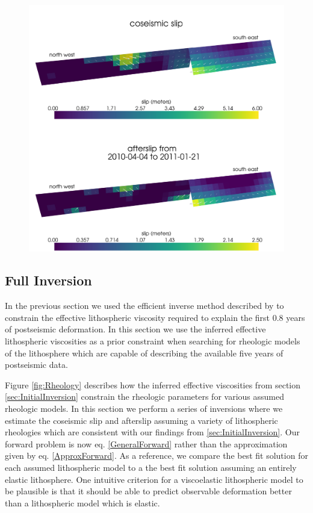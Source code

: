 \documentclass[1p]{elsarticle}
\begin{document}
\begin{figure}
\includegraphics[scale=0.09]{Figures/initialslip}
\caption{}
\label{fig:InitialSlip}
\end{figure} 
 
\subsection{Full Inversion}\label{sec:FullInversion} 

In the previous section we used the efficient inverse method described by \cite{Hines2015} to constrain the effective lithospheric viscosity required to explain the first 0.8 years of postseismic deformation. In this section we use the inferred effective lithospheric viscosities as a prior constraint when searching for rheologic models of the lithosphere which are capable of describing the available five years of postseismic data.   

Figure \ref{fig:Rheology} describes how the inferred effective viscosities from section \ref{sec:InitialInversion} constrain the rheologic parameters for various assumed rheologic models. In this section we perform a series of inversions where we estimate the coseismic slip and afterslip assuming a variety of lithospheric rheologies which are consistent with our findings from \ref{sec:InitialInversion}.  Our forward problem is now eq. \ref{GeneralForward} rather than the approximation given by eq. \ref{ApproxForward}.  As a reference, we compare the best fit solution for each assumed lithospheric model to a the best fit solution assuming an entirely elastic lithosphere. One intuitive criterion for a viscoelastic lithospheric model to be plausible is that it should be able to predict observable deformation better than a lithospheric model which is elastic.   
\end{document}
